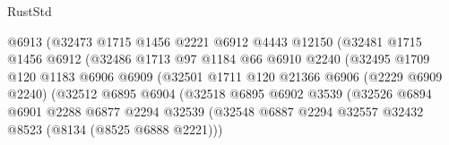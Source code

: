\begin{lexlean}{RustStd}
\begin{coremodule}
{\begin{coremodule}
{{{{{{{{{{{{{{{{{{{{{{{{{{{{{{{{{{{{{{{{{{{{{{{{{{{{{                                  @6913
                                  (@32473
                                    @1715
                                    @1456
                                    @2221
                                    @6912
                                    @4443
                                    @12150
                                    (@32481
                                      @1715
                                      @1456
                                      @6912
                                      (@32486
                                        @1713
                                        @97
                                        @1184
                                        @66
                                        @6910
                                        @2240
                                        (@32495
                                          @1709
                                          @120
                                          @1183
                                          @6906
                                          @6909
                                          (@32501
                                            @1711
                                            @120
                                            @21366
                                            @6906
                                            (@2229 @6909 @2240)
                                            (@32512
                                              @6895
                                              @6904
                                              (@32518
                                                @6895
                                                @6902
                                                @3539
                                                (@32526
                                                  @6894
                                                  @6901
                                                  @2288
                                                  @6877
                                                  @2294
                                                  @32539
                                                  (@32548
                                                    @6887
                                                    @2294
                                                    @32557
                                                    @32432
                                                    @8523
                                                    (@8134 (@8525 @6888 @2221)))
}}}}}}}}}}}}}}}}}}}}}}}}}}}}}}}}}}}}}}}}}}}}}}}}}}}}}
\end{coremodule}}
\end{coremodule}
\end{lexlean}
